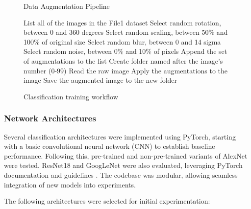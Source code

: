 \documentclass[conference]{IEEEtran}
\begin{document}
\begin{figure}[H]
  \begin{algorithm}[H]
  \caption{Data Augmentation Pipeline}
  \begin{algorithmic}[1]
  \STATE List all of the images in the File1 dataset
      \STATE Select random rotation, between 0 and 360 degrees
      \STATE Select random scaling, between 50\% and 100\% of original size
      \STATE Select random blur, between 0 and 14 sigma
      \STATE Select random noise, between 0\% and 10\% of pixels
      \STATE Append the set of augmentations to the list
    \ENDWHILE
      \STATE Create folder named after the image's number (0-99)
      \STATE Read the raw image
        \STATE Apply the augmentations to the image
        \STATE Save the augmented image to the new folder
      \ENDFOR
    \ENDFOR
  \end{algorithmic}
  \end{algorithm}
  \caption{Classification training workflow}
  \end{figure}

\subsubsection{Network Architectures}

Several classification architectures were implemented using PyTorch, starting with a basic convolutional neural network (CNN)
to establish baseline performance. Following this, pre-trained and non-pre-trained variants of AlexNet were tested. ResNet18
and GoogLeNet were also evaluated, leveraging PyTorch documentation and guidelines \textcite{pytorch_models}. The codebase was
modular, allowing seamless integration of new models into experiments.

The following architectures were selected for initial experimentation:
\end{document}
